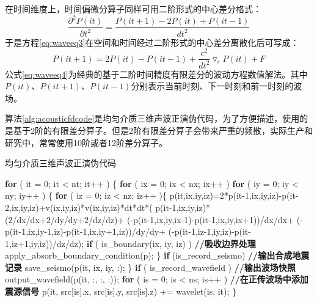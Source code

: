 \documentclass[degree=doctor]{thuthesis}
\begin{document}
在时间维度上，时间偏微分算子同样可用二阶形式的中心差分格式：
\begin{equation}
  \frac{\partial ^2 P(it)}{\partial t^2}=\frac{P(it+1)-2P(it)+P(it-1)}{dt^2}
\end{equation}
于是方程\ref{eq:waveeq3}在空间和时间经过二阶形式的中心差分离散化后可写成：
\begin{equation}
  P(it+1)=2P(it)-P(it-1)+\frac{c^2}{dt^2}\triangledown_s P(it)+F
  \label{eq:waveeq4}
\end{equation}
公式\ref{eq:waveeq4}为经典的基于二阶时间精度有限差分的波动方程数值解法。其中$P(it)$、$P(it+1)、$$P(it-1)$分别表示当前时刻、下一时刻和前一时刻的波场。

算法\ref{alg:acousticfdcode}是均匀介质三维声波正演伪代码，为了方便描述，使用的是基于2阶的有限差分算子\cite{fu2011eliminating}。但是2阶有限差分算子会带来严重的频散，实际生产和研究中，常常使用10阶或者12阶差分算子。

\begin{algorithm}[ht]
\small
\caption{均匀介质三维声波正演伪代码}\label{alg:acousticfdcode}
\begin{algorithmic}[1]
\State \textbf{for} ( it = 0; it < nt; it++ ) \{ \label{ln:fdntbegin}
\State \quad\quad \textbf{for} ( ix = 0; ix < nx; ix++ )
\State \quad\quad\quad\quad \textbf{for} ( iy = 0; iy < ny; iy++ ) \{
\State \quad\quad\quad\quad\quad\quad \textbf{for} ( iz = 0; iz < nz; iz++ )\{
\State \quad\quad\quad\quad\quad\quad\quad\quad  p(it,ix,iy,iz)=2*p(it-1,ix,iy,iz)-p(it-2,ix,iy,iz)+v(ix,iy,iz)*v(ix,iy,iz)*dt*dt*(
\State \quad\quad\quad\quad\quad\quad\quad\quad\quad\quad\quad\quad\quad\quad\quad                                    p(it-1,ix,iy,iz)*(2/dx/dx+2/dy/dy+2/dz/dz)+
\State \quad\quad\quad\quad\quad\quad\quad\quad\quad\quad\quad\quad\quad\quad\quad                                    (-p(it-1,ix,iy,ix-1)-p(it-1,ix,iy,ix+1))/dx/dx+
\State \quad\quad \quad\quad\quad\quad\quad\quad\quad\quad\quad\quad\quad\quad\quad                                    (-p(it-1,ix,iy-1,iz)-p(it-1,ix,iy+1,iz))/dy/dy+
\State \quad\quad\quad\quad\quad\quad\quad\quad\quad\quad\quad\quad\quad\quad\quad                                    (-p(it-1,iz-1,iy,iz)-p(it-1,iz+1,iy,iz))/dz/dz);
\State
\State \quad\quad\quad\quad\quad\quad\quad\quad \textbf{if} ( is\_boundary(ix, iy, iz) ) \textbf{//吸收边界处理} \label{ln:fdboundary}
\State \quad\quad\quad\quad\quad\quad\quad\quad\quad\quad\quad    apply\_absorb\_boundary\_condition(p);
\State \quad\quad\quad\quad\quad\quad                \} \label{ln:fdntend}
\State \quad\quad\quad\quad\quad\quad \textbf{if} (is\_record\_seismo) \textbf{//输出合成地震记录}
\State \quad\quad\quad\quad\quad\quad\quad\quad save\_seismo(p(it, ix, iy, :);
\State \quad\quad\quad\quad \}
\State
\State \quad\quad \textbf{if} ( is\_record\_wavefield ) \textbf{//输出波场快照}
\State \quad\quad\quad\quad output\_wavefield(p(it, :, :, :));
\State
\State \quad\quad \textbf{for} ( is = 0; is < ns; is++ ) \textbf{//在正传波场中添加震源信号}
\State \quad\quad\quad\quad p(it, src[is].x, src[is].y, src[is].z) += wavelet(is, it);
\State \}
\end{algorithmic}
\end{algorithm}
\end{document}
